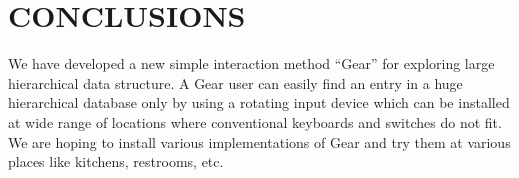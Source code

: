 \documentclass{article}
\begin{document}

\section*{CONCLUSIONS}

We have developed a new simple interaction method ``Gear'' for exploring
large hierarchical data structure.
A Gear user can easily find an entry in a huge hierarchical database
only by using a rotating input device which can be installed at
wide range of locations where conventional keyboards and switches do not fit.
We are hoping to install various implementations of Gear and try them at
various places like kitchens, restrooms, etc.

\small{


}
\end{document}
